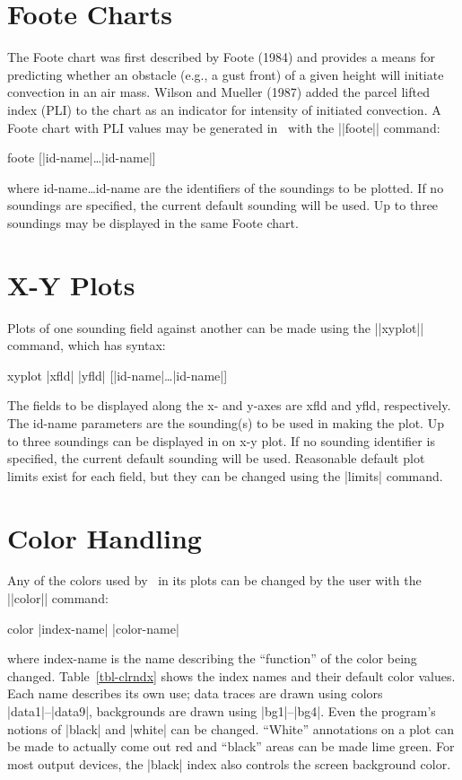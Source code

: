 \section{Foote Charts}
The Foote chart was first described by Foote (1984) and provides a means for 
predicting whether an obstacle (e.g., a gust front) of a given height will
initiate convection in an air mass.  Wilson and Mueller (1987) added the parcel
lifted index (PLI) to the chart as an indicator for intensity of initiated
convection.  A Foote chart with PLI values may be generated in \suds\ with the
||foote|| command:
\begin{example}
	foote [|id-name|\ldots|id-name|]
\end{example}
where {\pf id-name\ldots id-name} are the identifiers of the 
soundings to be plotted.  If no soundings are specified, the current default
sounding will be used.  Up to three soundings may be displayed in the same
Foote chart.

\section{X-Y Plots}
Plots of one sounding field against another can be made using the ||xyplot|| 
command, which has syntax:
\begin{example}
	xyplot |xfld| |yfld| [|id-name|\ldots|id-name|]
\end{example}
The fields to be displayed along the x- and y-axes are {\pf xfld} and 
{\pf yfld}, respectively.  The {\pf id-name} parameters are the sounding(s)
to be used in making the plot.  Up to three soundings can be displayed in
on x-y plot.  If no sounding identifier is specified, the current default
sounding will be used.  Reasonable default plot limits exist for each
field, but they can be changed using the |limits| command.


\section{Color Handling}
Any of the colors used by \suds\ in its plots can be changed by the user
with the ||color|| command:
\begin{example}
	color |index-name| |color-name|
\end{example}
where {\pf index-name} is the name describing the ``function'' of the color
being changed.  Table~\ref{tbl-clrndx} shows the index names and their default 
color values.  Each name describes its own use; data traces are drawn using
colors |data1|--|data9|, backgrounds are drawn using |bg1|--|bg4|.  Even
the program's notions of |black| and |white| can be changed.  ``White''
annotations on a plot can be made to actually come out red and ``black'' areas
can be made lime green.  For most output devices, the |black| index also 
controls the screen background color.

